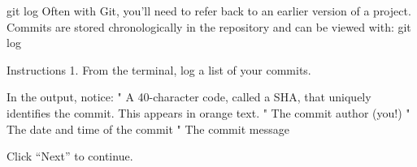 git log
    Often with Git, you’ll need to refer back to an earlier version of a project. Commits are stored chronologically in the repository and can be viewed with:
        git log

Instructions
    1.
    From the terminal, log a list of your commits.

    In the output, notice:
        " A 40-character code, called a SHA, that uniquely identifies the commit. This appears in orange text.
        " The commit author (you!)
        " The date and time of the commit
        " The commit message
    
    Click “Next” to continue.